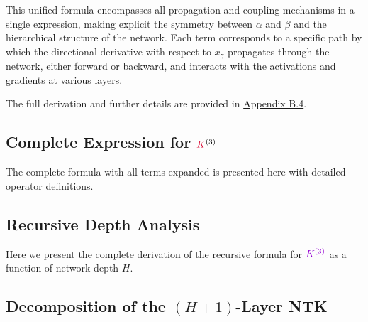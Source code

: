 \documentclass[a4paper]{article}
\theoremstyle{plain}
\theoremstyle{definition}
\theoremstyle{remark}
\begin{document}
\begin{tcolorbox}[colback=theoremcolor!10,colframe=theoremcolor!60!black,title={\textbf{Unified Structure of $\textcolor{k3color}{K^{(3)}}$}},enhanced,drop shadow]
\end{tcolorbox}

\noindent
This unified formula encompasses all propagation and coupling mechanisms in a single expression, making explicit the symmetry between $\alpha$ and $\beta$ and the hierarchical structure of the network. Each term corresponds to a specific path by which the directional derivative with respect to $x_\gamma$ propagates through the network, either forward or backward, and interacts with the activations and gradients at various layers.

The full derivation and further details are provided in \hyperref[sec:appendix_expanded_formula]{Appendix B.4}.

\subsection{Complete Expression for $\textcolor{kernelcolor}{K}^{(3)}$}\label{sec:appendix_complete_expression}

The complete formula with all terms expanded is presented here with detailed operator definitions.





\subsection{Recursive Depth Analysis}\label{sec:appendix_recursive_derivation}

Here we present the complete derivation of the recursive formula for $\textcolor{k3color}{K^{(3)}}$ as a function of network depth $H$.

\subsection{Decomposition of the $(H+1)$-Layer NTK}
\end{document}
